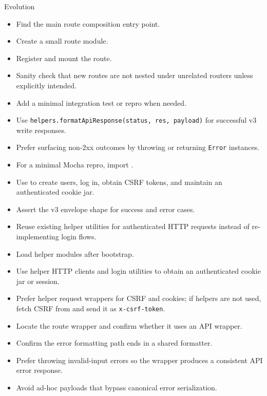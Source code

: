 \begin{svpromptbox}{Evolution}
\svpartsep
{}
\begin{itemize}
    \item Find the main route composition entry point.
    \item Create a small route module.
    \item Register and mount the route.
    \item Sanity check that new routes are not nested under unrelated routers unless explicitly intended.
    \item Add a minimal integration test or repro when needed.
\end{itemize}
\begin{itemize}
    \item Use \texttt{helpers.formatApiResponse(status, res, payload)} for successful v3 write responses.
    \item Prefer surfacing non-2xx outcomes by throwing or returning \texttt{Error} instances.
    \item For a minimal  Mocha repro, import .
    \item Use  to create users, log in, obtain CSRF tokens, and maintain an authenticated cookie jar.
    \item Assert the v3 envelope shape for success and error cases.
\end{itemize}
\begin{itemize}
    \item Reuse existing helper utilities for authenticated HTTP requests instead of re-implementing login flows.
    \item Load helper modules after bootstrap.
    \item Use helper HTTP clients and login utilities to obtain an authenticated cookie jar or session.
    \item Prefer helper request wrappers for CSRF and cookies; if helpers are not used, fetch CSRF from  and send it as \texttt{x-csrf-token}.
\end{itemize}
\begin{itemize}
    \item Locate the route wrapper and confirm whether it uses an API wrapper.
    \item Confirm the error formatting path ends in a shared formatter.
    \item Prefer throwing invalid-input errors so the wrapper produces a consistent API error response.
    \item Avoid ad-hoc payloads that bypass canonical error serialization.
\end{itemize}


\end{svpromptbox}
